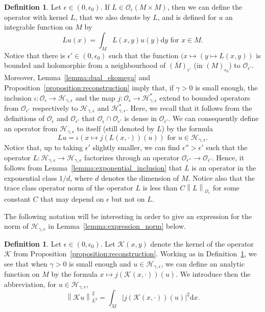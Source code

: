 \documentclass[10pt]{amsart}
\theoremstyle{definition}\newtheorem{defi}[theo]{Definition}\newtheorem{rema}[theo]{Remark}\newtheorem{exam}[theo]{Example}\newtheorem{exem}[theo]{Example}\newtheorem{nota}[theo]{Notation}
\newcommand{\p}[1]{\left(#1\right)}
\newcommand{\n}[1]{\left\|#1\right\|}
\newcommand{\va}[1]{\left|#1\right|}
\newcommand{\clO}{\mathcal{O}}
\newcommand{\clH}{\mathcal{H}}
\newcommand{\clK}{\mathcal{K}}
\newcommand{\rmd}{\mathrm{d}}
\begin{document}
\begin{defi}\label{definition:analytic_kernels}
Let $\epsilon \in (0,\epsilon_0)$. If $L \in \clO_\epsilon(M \times M)$, then we can define the operator with kernel $L$, that we also denote by $L$, and is defined for $u$ an integrable function on $M$ by
\begin{equation*}
Lu (x) = \int_M L(x,y) u(y) \rmd y \text{ for } x \in M.
\end{equation*}
Notice that there is $\epsilon' \in (0,\epsilon_0)$ such that the function $(x \mapsto (y \mapsto L(x,y))$ is bounded and holomorphic from a neighbourhood of $\overline{(M)}_{\epsilon'}$ (in $(M)_{\epsilon_0}$) to $\clO_{\epsilon'}$. Moreover, Lemma~\ref{lemma:dual_ekomega} and Proposition~\ref{proposition:reconstruction} imply that, if $\gamma > 0$ is small enough, the inclusion $\iota : \clO_\epsilon \to \clH_{\gamma,\epsilon}$ and the map $j : \clO_\epsilon \to \clH_{\gamma,\epsilon}^*$ extend to bounded operators from $\clO_{\epsilon'}$ respectively to $\clH_{\gamma,\epsilon}$ and $\clH_{\gamma,\epsilon}^*$. Here, we recall that it follows from the definitions of $\clO_\epsilon$ and $\clO_{\epsilon'}$ that $\clO_{\epsilon} \cap \clO_{\epsilon'}$ is dense in $\clO_{\epsilon'}$. We can consequently define an operator from $\clH_{\gamma,\epsilon}$ to itself (still denoted by $L$) by the formula
\begin{equation*}
L u = \iota \p{ x \mapsto j(L(x,\cdot))(u)} \text{ for } u \in \clH_{\gamma,\epsilon}.
\end{equation*}
Notice that, up to taking $\epsilon'$ slightly smaller, we can find $\epsilon'' > \epsilon'$ such that the operator $L : \clH_{\gamma,\epsilon} \to \clH_{\gamma,\epsilon}$ factorizes through an operator $\clO_{\epsilon''} \to \clO_{\epsilon'}$. Hence, it follows from Lemma~\ref{lemma:exponential_inclusion} that $L$ is an operator in the exponential class $1/d$, where $d$ denotes the dimension of $M$. Notice also that the trace class operator norm of the operator $L$ is less than $C \n{L}_{\clO_\epsilon}$ for some constant $C$ that may depend on $\epsilon$ but not on $L$.
\end{defi}

The following notation will be interesting in order to give an expression for the norm of $\clH_{\gamma,\epsilon}$ in Lemma~\ref{lemma:expression_norm} below.

\begin{defi}
Let $\epsilon \in (0,\epsilon_0)$. Let $\clK (x,y)$ denote the kernel of the operator $\clK $ from Proposition~\ref{proposition:reconstruction}. Working as in Definition~\ref{definition:analytic_kernels}, we see that when $\gamma > 0$ is small enough and $u \in \clH_{\gamma,\epsilon}$, we can define an analytic function on $M$ by the formula $x \mapsto j(\clK (x,\cdot))(u)$. We introduce then the abbreviation, for $u \in \clH_{\gamma,\epsilon}$,
\begin{equation*}
\n{\clK u}_{L^2}^2 = \int_M \va{j(\clK (x,\cdot))(u)}^2 \rmd x.
\end{equation*}
\end{defi}
\end{document}

